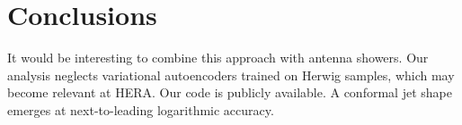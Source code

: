 \section{Conclusions}\label{sec:conclusions}

It would be interesting to combine this approach with antenna showers.
Our analysis neglects variational autoencoders trained on Herwig
samples, which may become relevant at HERA. Our code is publicly
available. A conformal jet shape emerges at next-to-leading logarithmic
accuracy.

